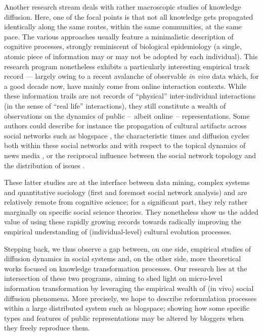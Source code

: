 Another research stream deals with rather macroscopic studies of knowledge diffusion. Here, one of the focal points is that not all knowledge gets propagated identically along the same routes, within the same communities, at the same pace. The various approaches usually feature a minimalistic description of cognitive processes, strongly reminiscent of biological epidemiology (a single, atomic piece of information may or may not be adopted by each individual).  
This research program nonetheless exhibits a particularly interesting empirical track record --- largely owing to a recent avalanche of observable \emph{in vivo} data which, for a good decade now, have mainly come from online interaction contexts.
While these information trails are not records of ``physical'' inter-individual interactions (in the sense of ``real life'' interactions), they still constitute a wealth of observations on the dynamics of public --~albeit online~-- representations.
Some authors could describe for instance the propagation of cultural artifacts across social networks such as blogspace \citep{Gruhl04}, the characteristic times and diffusion cycles both within these social networks and with respect to the topical dynamics of news media \citep{Leskovec09}, or the reciprocal influence between the social network topology and the distribution of issues \citep{Cointet09}.

These latter studies are at the interface between data mining, complex systems and quantitative sociology (first and foremost social network analysis) and are relatively remote from cognitive science; for a significant part, they rely rather marginally on specific social science theories. They nonetheless show us the added value of using these rapidly growing records %
towards radically improving the empirical understanding of (individual-level) cultural evolution processes.


\bigskip
Stepping back, we thus observe a gap between, on one side, empirical studies of diffusion dynamics in social systems and, on the other side, more theoretical works  focused on knowledge transformation processes. %
Our research lies at the intersection of these two programs, aiming to shed light on micro-level information transformation by leveraging the empirical wealth of (in vivo) social diffusion phenomena. More precisely, we hope to describe reformulation processes within a large distributed system such as blogspace; showing how some specific types and features of public representations may be altered by bloggers when they freely reproduce them.

